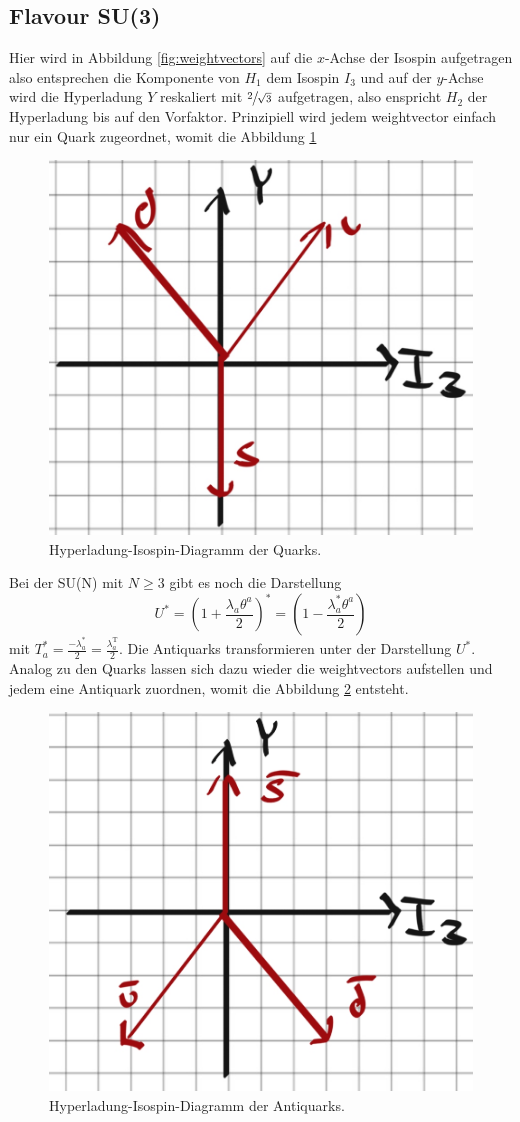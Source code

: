 \documentclass[
  captions=tableheading,  %
  titlepage=firstiscover, %
]{scrartcl}
\begin{document}
\subsection{Flavour SU(3)}
Hier wird in Abbildung \ref{fig:weightvectors} auf die $x$-Achse der Isospin 
aufgetragen also entsprechen die Komponente von $H_1$ dem Isospin $I_3$ und auf der 
$y$-Achse wird die Hyperladung $Y$ reskaliert mit $\sfrac{2}{\sqrt{3}}$ aufgetragen, also enspricht 
$H_2$ der Hyperladung bis auf den Vorfaktor. 
Prinzipiell wird jedem weightvector einfach nur ein Quark zugeordnet, womit 
die Abbildung \ref{fig:quark}
\begin{figure}
  \centering
  \includegraphics[width = 0.35 \textwidth]{Quark.jpg}
  \caption{Hyperladung-Isospin-Diagramm der Quarks.}
  \label{fig:quark}
\end{figure}
Bei der SU(N) mit $N \geq 3$ gibt es noch die Darstellung 
\begin{equation*}
  U^* = (1 + \frac{\lambda_a\theta^a}{2})^* = (1 - \frac{\lambda_a^*\theta^a}{2})
\end{equation*}
mit $T_a^* =\frac{-\lambda_a^*}{2} = \frac{\lambda_a^{\text{T}}}{2}$.
Die Antiquarks transformieren unter der Darstellung $U^*$.
Analog zu den Quarks lassen sich dazu wieder die weightvectors aufstellen und jedem 
eine Antiquark zuordnen, womit die Abbildung \ref{fig:antiquark} entsteht.
\begin{figure}
  \centering
  \includegraphics[width = 0.35 \textwidth]{antiquark.jpg}
  \caption{Hyperladung-Isospin-Diagramm der Antiquarks.}
  \label{fig:antiquark}
\end{figure}
\end{document}
